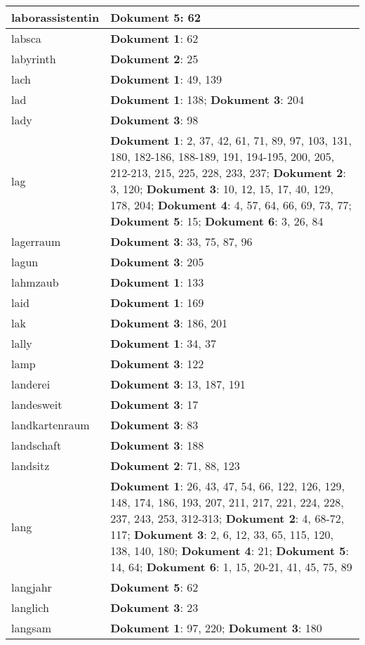 \documentclass[a5paper]{article}
\begin{document}
\begin{longtable}[l]{|l|p{3in}|}
\hline
laborassistentin & \textbf{Dokument 5}: 62 \\
\hline
labsca & \textbf{Dokument 1}: 62 \\
\hline
labyrinth & \textbf{Dokument 2}: 25 \\
\hline
lach & \textbf{Dokument 1}: 49, 139 \\
\hline
lad & \textbf{Dokument 1}: 138; \textbf{Dokument 3}: 204 \\
\hline
lady & \textbf{Dokument 3}: 98 \\
\hline
lag & \textbf{Dokument 1}: 2, 37, 42, 61, 71, 89, 97, 103, 131, 180, 182-186, 188-189, 191, 194-195, 200, 205, 212-213, 215, 225, 228, 233, 237; \textbf{Dokument 2}: 3, 120; \textbf{Dokument 3}: 10, 12, 15, 17, 40, 129, 178, 204; \textbf{Dokument 4}: 4, 57, 64, 66, 69, 73, 77; \textbf{Dokument 5}: 15; \textbf{Dokument 6}: 3, 26, 84 \\
\hline
lagerraum & \textbf{Dokument 3}: 33, 75, 87, 96 \\
\hline
lagun & \textbf{Dokument 3}: 205 \\
\hline
lahmzaub & \textbf{Dokument 1}: 133 \\
\hline
laid & \textbf{Dokument 1}: 169 \\
\hline
lak & \textbf{Dokument 3}: 186, 201 \\
\hline
lally & \textbf{Dokument 1}: 34, 37 \\
\hline
lamp & \textbf{Dokument 3}: 122 \\
\hline
landerei & \textbf{Dokument 3}: 13, 187, 191 \\
\hline
landesweit & \textbf{Dokument 3}: 17 \\
\hline
landkartenraum & \textbf{Dokument 3}: 83 \\
\hline
landschaft & \textbf{Dokument 3}: 188 \\
\hline
landsitz & \textbf{Dokument 2}: 71, 88, 123 \\
\hline
lang & \textbf{Dokument 1}: 26, 43, 47, 54, 66, 122, 126, 129, 148, 174, 186, 193, 207, 211, 217, 221, 224, 228, 237, 243, 253, 312-313; \textbf{Dokument 2}: 4, 68-72, 117; \textbf{Dokument 3}: 2, 6, 12, 33, 65, 115, 120, 138, 140, 180; \textbf{Dokument 4}: 21; \textbf{Dokument 5}: 14, 64; \textbf{Dokument 6}: 1, 15, 20-21, 41, 45, 75, 89 \\
\hline
langjahr & \textbf{Dokument 5}: 62 \\
\hline
langlich & \textbf{Dokument 3}: 23 \\
\hline
langsam & \textbf{Dokument 1}: 97, 220; \textbf{Dokument 3}: 180 \\

\end{longtable}
\end{document}
